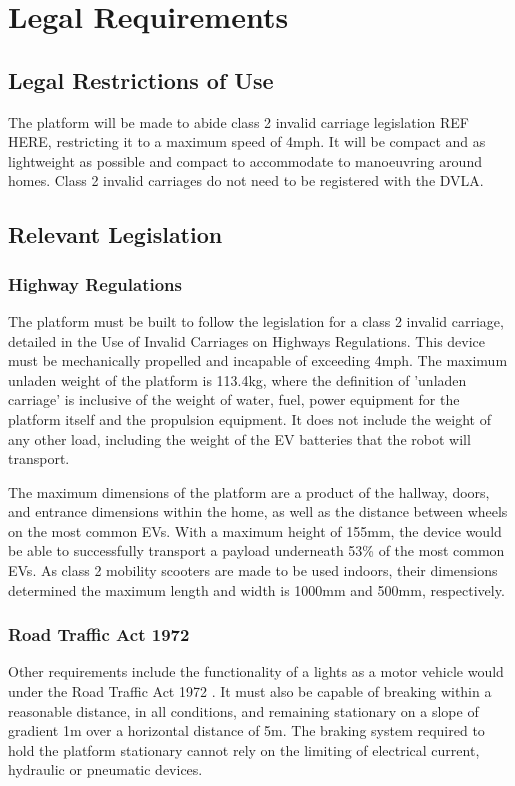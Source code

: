 \documentclass [12pt]{article}
\begin{document}
\section{Legal Requirements}
\subsection{Legal Restrictions of Use}
The platform will be made to abide class 2 invalid carriage legislation REF HERE, restricting it to a maximum speed of 4mph. It will be compact and as lightweight as possible and compact to accommodate to manoeuvring around homes. Class 2 invalid carriages do not need to be registered with the DVLA.

\subsection{Relevant Legislation}
\subsubsection{Highway Regulations}
The platform must be built to follow the legislation for a class 2 invalid carriage, detailed in the Use of Invalid Carriages \cite{Invalid_Legislation} on Highways Regulations. This device must be mechanically propelled and incapable of exceeding 4mph. The maximum unladen weight of the platform is 113.4kg, where the definition of 'unladen carriage' is inclusive of the weight of water, fuel, power equipment for the platform itself and the propulsion equipment. It does not include the weight of any other load, including the weight of the EV batteries that the robot will transport.

The maximum dimensions of the platform are a product of the hallway, doors, and entrance dimensions within the home, as well as the distance between wheels on the most common EVs. With a maximum height of 155mm, the device would be able to successfully transport a payload underneath 53\% of the most common EVs. As class 2 mobility scooters are made to be used indoors, their dimensions determined the maximum length and width is 1000mm and 500mm, respectively.

\subsubsection{Road Traffic Act 1972}
Other requirements include the functionality of a lights as a motor vehicle would under the Road Traffic Act 1972 \cite{Road_Traffic}. It must also be capable of breaking within a reasonable distance, in all conditions, and remaining stationary on a slope of gradient 1m over a horizontal distance of 5m. The braking system required to hold the platform stationary cannot rely on the limiting of electrical current, hydraulic or pneumatic devices.
\end{document}
